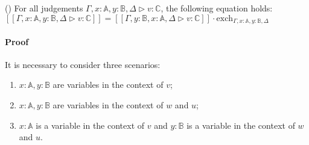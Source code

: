 \begin{lemma} \label{interpret_exch} () For all judgements $\Gamma,x:\mathbb{A}, y:\mathbb{B}, \Delta \triangleright v: \mathbb{C}$, the following equation holds: $[\![\Gamma,x:\mathbb{A}, y:\mathbb{B}, \Delta \triangleright v: \mathbb{C}]\!] = [\![\Gamma,y:\mathbb{B},x:\mathbb{A},  \Delta \triangleright v: \mathbb{C}]\! ] \cdot \text{exch}_{\Gamma, x : \mathbb{A}, y : \mathbb{B},\Delta} $ 
\end{lemma}

\paragraph{Proof}
It is necessary to consider three scenarios:
\begin{enumerate}
  \item $x:\mathbb{A}, y:\mathbb{B}$ are variables in the context of $v$;
  \item $x:\mathbb{A}, y:\mathbb{B}$ are variables in the context of $w$ and $u$;
  \item  $x:\mathbb{A}$ is a variable in the context of $v$ and $y:\mathbb{B}$ is a variable in the context of $w$ and $u$.
\end{enumerate}

